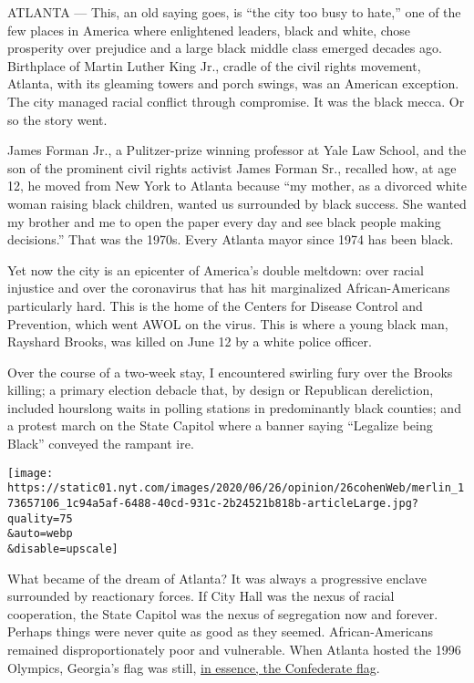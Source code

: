 ATLANTA --- This, an old saying goes, is ``the city too busy to hate,''
one of the few places in America where enlightened leaders, black and
white, chose prosperity over prejudice and a large black middle class
emerged decades ago. Birthplace of Martin Luther King Jr., cradle of the
civil rights movement, Atlanta, with its gleaming towers and porch
swings, was an American exception. The city managed racial conflict
through compromise. It was the black mecca. Or so the story went.

James Forman Jr., a Pulitzer-prize winning professor at Yale Law School,
and the son of the prominent civil rights activist James Forman Sr.,
recalled how, at age 12, he moved from New York to Atlanta because ``my
mother, as a divorced white woman raising black children, wanted us
surrounded by black success. She wanted my brother and me to open the
paper every day and see black people making decisions.'' That was the
1970s. Every Atlanta mayor since 1974 has been black.

Yet now the city is an epicenter of America's double meltdown: over
racial injustice and over the coronavirus that has hit marginalized
African-Americans particularly hard. This is the home of the Centers for
Disease Control and Prevention, which went AWOL on the virus. This is
where a young black man, Rayshard Brooks, was killed on June 12 by a
white police officer.

Over the course of a two-week stay, I encountered swirling fury over the
Brooks killing; a primary election debacle that, by design or Republican
dereliction, included hourslong waits in polling stations in
predominantly black counties; and a protest march on the State Capitol
where a banner saying ``Legalize being Black'' conveyed the rampant ire.

\texttt{[image: https://static01.nyt.com/images/2020/06/26/opinion/26cohenWeb/merlin\_173657106\_1c94a5af-6488-40cd-931c-2b24521b818b-articleLarge.jpg?quality=75\\\&auto=webp\\\&disable=upscale]}

What became of the dream of Atlanta? It was always a progressive enclave
surrounded by reactionary forces. If City Hall was the nexus of racial
cooperation, the State Capitol was the nexus of segregation now and
forever. Perhaps things were never quite as good as they seemed.
African-Americans remained disproportionately poor and vulnerable. When
Atlanta hosted the 1996 Olympics, Georgia's flag was still,
\href{https://www.latimes.com/archives/la-xpm-1996-07-19-mn-25755-story.html}{in
essence, the Confederate flag}.

